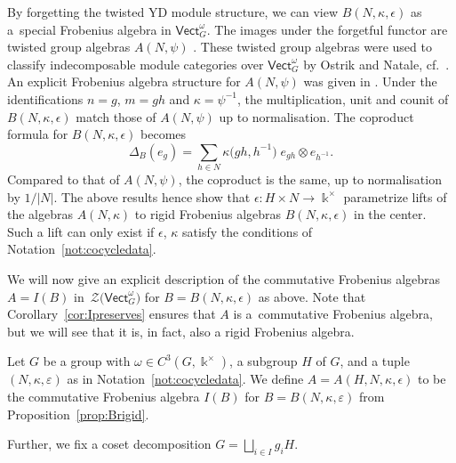 \documentclass[pdftex]{sigma}
\numberwithin{equation}{section}
\newcommand{\Vect}{\mathsf{Vect}}
\newcommand{\cZ}{\mathcal{Z}}
\newcommand{\rI}{I}
\begin{document}
\begin{Remark}
By forgetting the twisted YD module structure, we can view $B(N,\kappa,\epsilon)$ as a~special Frobenius algebra in $\Vect_G^{\omega}$. The images under the forgetful functor are twisted group algebras $A(N,\psi)$ \cite{Nat,Ost}. These twisted group algebras were used to classify indecomposable module categories over $\Vect_G^\omega$ by Ostrik and Natale, cf.\ \cite[Example~9.7.2]{EGNO}. An explicit Frobenius algebra structure for $A(N,\psi)$ was given in \cite[Proposition 5.7]{WINART}.
Under the identifications $n=g$, $m=gh$ and $\kappa = \psi^{-1}$, the multiplication, unit and counit of $B(N,\kappa,\epsilon)$ match those of $A(N,\psi)$ up to normalisation.
The coproduct formula for $B(N,\kappa,\epsilon)$ becomes
\[
\Delta_B(e_g) = \sum_{h\in N} \kappa\big(gh,h^{-1}\big) \;e_{gh}\otimes e_{h^{-1}}.
\]
Compared to that of $A(N,\psi)$, the coproduct is the same, up to normalisation by $1/|N|$.
 The above results hence show that $\epsilon\colon H\times N \to \Bbbk^\times $ parametrize lifts of the algebras $A(N,\kappa)$ to rigid Frobenius algebras $B(N,\kappa,\epsilon)$ in the center. Such a lift can only exist if $\epsilon$, $\kappa$ satisfy the conditions of Notation~\ref{not:cocycledata}.
\end{Remark}

We will now give an explicit description of the commutative Frobenius algebras $A=\rI(B)$ in~$\cZ\big(\Vect_G^\omega\big)$ for $B=B(N,\kappa,\epsilon)$ as above. Note that Corollary~\ref{cor:Ipreserves} ensures that $A$ is a~commutative Frobenius algebra, but we will see that it is, in fact, also a rigid Frobenius algebra.

\begin{Definition}\label{def:A}
Let $G$ be a group with $\omega\in C^3(G,\Bbbk^\times)$, a subgroup $H$ of $G$,
and a tuple $(N,\kappa,\varepsilon)$ as in Notation~\ref{not:cocycledata}.
We define $A=A(H,N,\kappa,\epsilon)$ to be the commutative Frobenius algebra $\rI(B)$ for $B=B(N,\kappa,\varepsilon)$ from Proposition~\ref{prop:Brigid}.

Further, we fix a coset decomposition $G=\bigsqcup_{i\in I} g_i H$.
\end{Definition}
\end{document}
